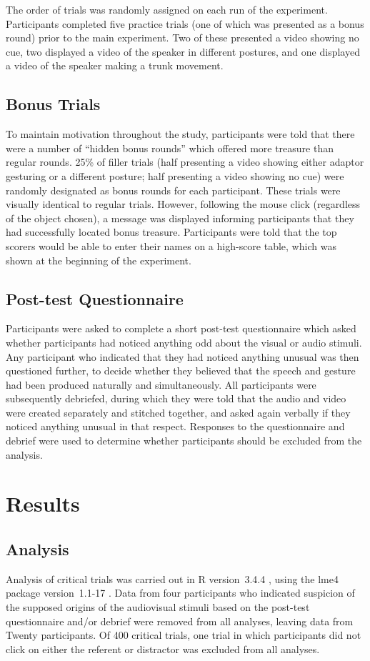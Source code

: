 \documentclass[a4paper,man,natbib]{apa6}
\begin{document}
The order of trials was randomly assigned on each run of the experiment.
Participants completed five practice trials (one of which was presented as a bonus round) prior to the main experiment. 
Two of these presented a video showing no cue, two displayed a video of the speaker in different postures, and one displayed a video of the speaker making a trunk movement.


\subsection{Bonus Trials}
To maintain motivation throughout the study, participants were told that there were a number of ``hidden bonus rounds'' which offered more treasure than regular rounds.
25\% of filler trials (half presenting a video showing either adaptor gesturing or a different posture; half presenting a video showing no cue) were randomly designated as bonus rounds for each participant.
These trials were visually identical to regular trials.
However, following the mouse click (regardless of the object chosen), a message was displayed informing participants that they had successfully located bonus treasure.
Participants were told that the top scorers would be able to enter their names on a high-score table, which was shown at the beginning of the experiment. 

\subsection{Post-test Questionnaire}
Participants were asked to complete a short post-test questionnaire which asked whether participants had noticed anything odd about the visual or audio stimuli.
Any participant who indicated that they had noticed anything unusual was then questioned further, to decide whether they believed that the speech and gesture had been produced naturally and simultaneously.
All participants were subsequently debriefed, during which they were told that the audio and video were created separately and stitched together, and asked again verbally if they noticed anything unusual in that respect. 
Responses to the questionnaire and debrief were used to determine whether participants should be excluded from the analysis.

\section{Results}

\subsection{Analysis}
Analysis of critical trials was carried out in R version~3.4.4 \citep{Rbase2017}, using the lme4 package version~1.1-17 \citep{Bates2015}. 
Data from four participants who indicated suspicion of the supposed origins of the audiovisual stimuli based on the post-test questionnaire and/or debrief were removed from all analyses, leaving data from Twenty participants. 
Of 400 critical trials, one trial in which participants did not click on either the referent or distractor was excluded from all analyses.
\end{document}

